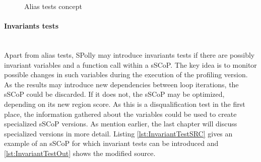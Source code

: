 \lstset{frame=none}
\begin{figure}[htbp]
  \centering

  \vspace*{5mm}
  
  \caption{Alias tests concept}
  \label{fig:Aliastest}  
\end{figure}
\resetlst

\orange
\begin{shaded}
\paragraph{Invariants tests \\}
~\\
Apart from alias tests, SPolly may introduce invariants tests if there are
possibly invariant variables and a function call within a sSCoP. The key idea
is to monitor possible changes in such variables during the execution of the 
profiling version. As the results may introduce new dependencies 
between loop iterations, the sSCoP could be discarded. If it does not, the sSCoP
may be optimized, depending on its new region score. As this is a 
disqualification test in the first place, the information gathered about the 
variables could be used to create specialized sSCoP versions. 
As mention earlier, the last chapter will discuss specialized versions 
in more detail. Listing \ref{lst:InvariantTestSRC} gives an example of an sSCoP 
for which invariant tests can be introduced and \ref{lst:InvariantTestOut} shows
the modified source. 

\end{shaded}

